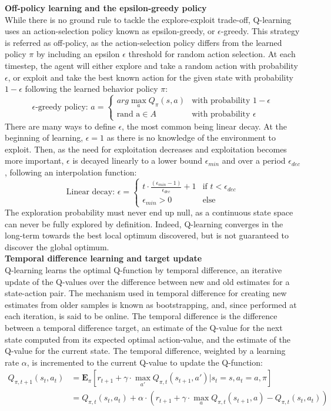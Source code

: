 \textbf{Off-policy learning and the epsilon-greedy policy} \\
While there is no ground rule to tackle the explore-exploit trade-off, Q-learning uses an action-selection policy known as epsilon-greedy, or $\epsilon$-greedy. This strategy is referred as off-policy, as the action-selection policy differs from the learned policy $\pi$ by including an epsilon $\epsilon$ threshold for random action selection. At each timestep, the agent will either explore and take a random action with probability $\epsilon$, or exploit and take the best known action for the given state with probability $1-\epsilon$ following the learned behavior policy $\pi$:
\[ 
\epsilon\text{-greedy policy: } a = 
    \begin{cases}
      arg \max_{a}Q_\pi(s,a) & \text{with probability } 1-\epsilon\\
      \text{rand a} \in A & \text{with probability } \epsilon
    \end{cases}
\]
There are many ways to define $\epsilon$, the most common being linear decay. At the beginning of learning, $\epsilon = 1$ as there is no knowledge of the environment to exploit. Then, as the need for exploitation decreases and exploitation becomes more important, $\epsilon$ is decayed linearly to a lower bound $\epsilon_{min}$ and over a period $\epsilon_{dec}$, following an interpolation function:
\[ 
\text{Linear decay: } \epsilon = 
    \begin{cases}
      t \cdot \frac{(\epsilon_{min}-1)}{\epsilon_{dec}} + 1 & \text{if } t < \epsilon_{dec}\\
      \epsilon_{min} > 0 & \text{else}
    \end{cases}
\]
The exploration probability must never end up null, as a continuous state space can never be fully explored by definition. Indeed, Q-learning converges in the long-term towards the best local optimum discovered, but is not guaranteed to discover the global optimum. \\

\textbf{Temporal difference learning and target update} \\
Q-learning learns the optimal Q-function by temporal difference, an iterative update of the Q-values over the difference between new and old estimates for a state-action pair. The mechanism used in temporal difference for creating new estimates from older samples is known as bootstrapping, and, since performed at each iteration, is said to be online. The temporal difference is the difference between a temporal difference target, an estimate of the Q-value for the next state computed from its expected optimal action-value, and the estimate of the Q-value for the current state. The temporal difference, weighted by a learning rate $\alpha$, is incremented to the current Q-value to update the Q-function:
\[ 
\begin{split}
Q_{\pi,t+1}(s_{t},a_{t})&= \mathbf{E}_{\pi}[r_{t+1}+\gamma \cdot \max_{a'} Q_{\pi,t}(s_{t+1},a')|s_t=s,a_t=a, \pi] \\
&=Q_{\pi,t}(s_{t},a_{t})+\alpha \cdot (r_{t+1}+\gamma \cdot \max_{a}Q_{\pi,t}(s_{t+1},a)-Q_{\pi,t}(s_{t},a_{t})) 
\end{split}
\]

